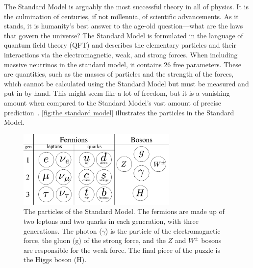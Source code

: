 The Standard Model is arguably the most successful theory in all of physics.
It is the culmination of centuries, if not millennia, of scientific advancements.
As it stands, it is humanity's best answer to the age-old question---what are the laws that govern the universe?
The Standard Model is formulated in the language of quantum field theory (QFT) and describes the elementary particles and their interactions via the electromagnetic, weak, and strong forces.
When including massive neutrinos in the standard model, it contains 26 free parameters.
These are quantities, such as the masses of particles and the strength of the forces, which cannot be calculated using the Standard Model but must be measured and put in by hand.
This might seem like a lot of freedom, but it is a vanishing amount when compared to the Standard Model's vast amount of precise prediction~\cite{Schwartz:QFT,griffiths:introduction,kramer:the_standard_model}.
\autoref{fig:the standard model} illustrates the particles in the Standard Model.

\begin{figure}[h]
    \centering
    \includegraphics[width=0.7\textwidth]{figurer/standard_model2.pdf}
    \caption{The particles of the Standard Model. The fermions are made up of two leptons and two quarks in each generation, with three generations. The photon ($\gamma$) is the particle of the electromagnetic force, the gluon (g) of the strong force, and the $Z$ and $W^\pm$ bosons are responsible for the weak force. The final piece of the puzzle is the Higgs boson (H).}
    \label{fig:the standard model}
\end{figure}

